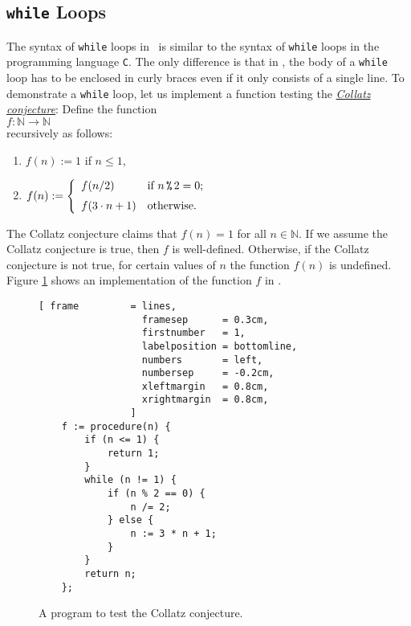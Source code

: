 \subsection{\texttt{while} Loops}
The syntax of \texttt{while} loops in \setlx\ is similar to the syntax of
\texttt{while} loops in the programming language \texttt{C}.  The only difference is that in \setlx,
the body of a \texttt{while} loop has to be enclosed in curly braces even if it only consists of a single line.
To demonstrate a \texttt{while} loop,
let us implement a function testing the 
\href{http://en.wikipedia.org/wiki/Collatz_conjecture}{\emph{Collatz conjecture}}:  Define the function
\\[0.2cm]
\hspace*{1.3cm}
$f: \mathbb{N} \rightarrow \mathbb{N}$
\\[0.2cm]
recursively as follows:
\begin{enumerate}
\item $f(n) := 1$ \hspace*{2.13cm} if $n \leq 1$,
\item $f(n) := \left\{
       \begin{array}[c]{ll}
         f(n/2)           & \mbox{if $n \,\texttt{\symbol{37}}\, 2 = 0$;} \\[0.2cm]  
         f(3 \cdot n + 1) & \mbox{otherwise.} 
       \end{array}
       \right.
      $ 
\end{enumerate}
The Collatz conjecture claims that $f(n) = 1$  for all $n \in \mathbb{N}$. 
If we assume the Collatz conjecture is true, then $f$ is well-defined.
Otherwise, if the Collatz conjecture is not true, for certain values of $n$ the function $f(n)$ is undefined.
Figure \ref{fig:ulam.stlx} shows an implementation of the function $f$ in \setlx.  

\begin{figure}[!ht]
\centering
\begin{Verbatim}[ frame         = lines, 
                  framesep      = 0.3cm, 
                  firstnumber   = 1,
                  labelposition = bottomline,
                  numbers       = left,
                  numbersep     = -0.2cm,
                  xleftmargin   = 0.8cm,
                  xrightmargin  = 0.8cm,
                ]
    f := procedure(n) {
        if (n <= 1) {
            return 1;   
        }
        while (n != 1) {
            if (n % 2 == 0) {
                n /= 2;
            } else {
                n := 3 * n + 1;
            }
        }
        return n;
    };
\end{Verbatim}
\vspace*{-0.3cm}
\caption{A program to test the Collatz conjecture.}
\label{fig:ulam.stlx}
\end{figure}

